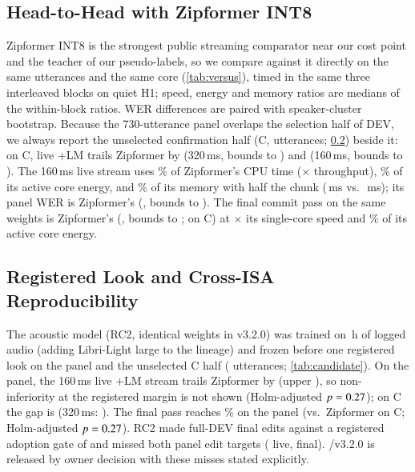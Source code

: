 \subsection{Head-to-Head with Zipformer INT8}\label{sec:versus}

Zipformer INT8 is the strongest public streaming comparator near our cost point and the teacher of our
pseudo-labels, so we compare against it directly on the same utterances and the same core
(\cref{tab:versus}), timed in the same three interleaved blocks on quiet H1; speed, energy and memory
ratios are medians of the within-block ratios. WER differences are paired with speaker-cluster
bootstrap. Because the 730-utterance panel overlaps the selection half of DEV, we always report the
unselected confirmation half (C, \CandCUtts{} utterances; \cref{sec:candidate}) beside it: on C, live
+LM trails Zipformer by \CandLiveLmEightCDelta\pp (320\,ms, bounds \CandLiveLmEightCLo{} to
\CandLiveLmEightCHi) and \CandLiveLmCDelta\pp (160\,ms, bounds \CandLiveLmCLo{} to \CandLiveLmCHi).
The 160\,ms live stream uses \VsCpuPctOne\% of Zipformer's CPU time (\VsSpeedXOne$\times$ throughput),
\VsEnergyPctOne\% of its active core energy, and \VsRssPctOne\% of its memory with half the chunk
(\VsChunkOne\,ms vs.\ \VsZipChunk\,ms); its panel WER is \VsVerdictOne{} Zipformer's (\VsDeltaOne\pp,
bounds \VsLoOne{} to \VsHiOne\pp). The final commit pass on the same weights is \VsVerdictTwo{}
Zipformer's (\VsDeltaTwo\pp, bounds \VsLoTwo{} to \VsHiTwo\pp; \CandFinalCDelta\pp on C) at
\VsSpeedXTwo$\times$ its single-core speed and \VsEnergyPctTwo\% of its active core energy.



\subsection{Registered Look and Cross-ISA Reproducibility}\label{sec:candidate}

The \ReleaseVer{} acoustic model (RC2, identical weights in v3.2.0) was trained on \CandTrainKh\,h of
logged audio (adding Libri-Light large to the lineage) and frozen before one registered look on the
panel and the unselected C half (\CandCUtts{} utterances; \cref{tab:candidate}). On the panel, the
160\,ms live +LM stream trails Zipformer by \CandLiveLmPanelDelta\pp (upper \CandLiveLmPanelHi\pp), so
non-inferiority at the registered \CandNiMargin\pp margin is not shown (Holm-adjusted
$p=0.27$); on C the gap is \CandLiveLmCDelta\pp (320\,ms: \CandLiveLmEightCDelta\pp). The final
pass reaches \CandFinalWer\% on the panel (\CandFinalCDelta\pp vs.\ Zipformer on C; Holm-adjusted
$p=0.27$). RC2 made \CandFinalFullEdits{} full-DEV final edits against a registered adoption
gate of \CandGateFinalFull{} and missed both panel edit targets (\CandGateLivePanel{} live,
\CandGateFinalPanel{} final). \ultra{} \ReleaseVer{}/v3.2.0 is released by owner decision with these
misses stated explicitly.

